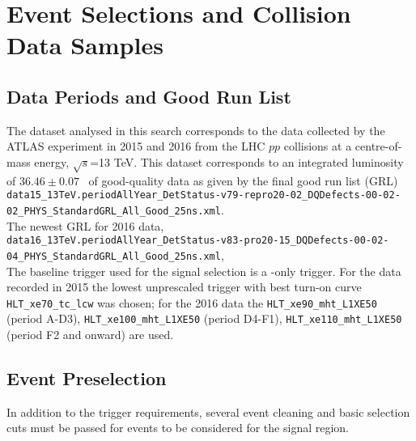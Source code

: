 \chapter{Event Selections and Collision Data Samples}
\label{chap:selections}
\section{Data Periods and Good Run List}
\label{EventSel:GRL}
The dataset analysed in this search corresponds to the data collected by the ATLAS experiment in 2015 and 2016 from the LHC $pp$ collisions at a centre-of-mass energy, $\sqrt{s}$=13 TeV. This dataset corresponds to an integrated luminosity of $36.46\pm 0.07$ \ifb\ of good-quality data as given by the final good run list (GRL)\\
 {\tt \scriptsize data15\_13TeV.periodAllYear\_DetStatus-v79-repro20-02\_DQDefects-00-02-02\_PHYS\_StandardGRL\_All\_Good\_25ns.xml}.\\
The newest GRL for 2016 data,\\ {\tt \scriptsize data16\_13TeV.periodAllYear\_DetStatus-v83-pro20-15\_DQDefects-00-02-04\_PHYS\_StandardGRL\_All\_Good\_25ns.xml},\\ 

The baseline trigger used for the signal selection is a \met-only trigger. For the data recorded in 2015 the lowest unprescaled trigger with best turn-on curve {\tt HLT\_xe70\_tc\_lcw} was chosen; for the 2016 data the \verb+HLT_xe90_mht_L1XE50+ (period A-D3), \verb+HLT_xe100_mht_L1XE50+ (period D4-F1), \verb+HLT_xe110_mht_L1XE50+ (period F2 and onward) are used.\\

\section{Event Preselection}
\label{sec:Selection_EventPreselection}

In addition to the trigger requirements, several event cleaning and basic selection cuts must be passed for events to be considered for the signal region.

